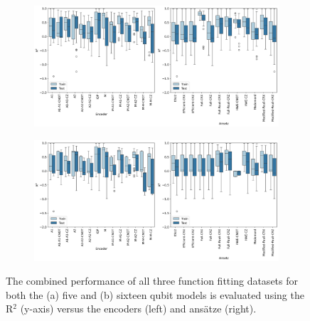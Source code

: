 \documentclass[journal=jacsat,manuscript=article]{achemso}
\begin{document}
\begin{figure}[H]
	\centering
	\begin{subfigure}[b]{0.49\textwidth}
		\centering
		\includegraphics[width=\textwidth]{../images/Function_Fitting/fivequbit/five_feature_function_fitting_boxplots.png}
		\caption{}
		\label{fig:five_feature_function_fitting_boxplots}
	\end{subfigure}
	\hfill		
	\begin{subfigure}[b]{0.49\textwidth}
		\centering
		\includegraphics[width=\textwidth]{../images/Function_Fitting/sixteenqubit/sixteen_feature_function_fitting_boxplots.png}
		\caption{}
		\label{fig:sixteen_feature_function_fitting_boxplots}
	\end{subfigure}
	\hfill		
	\caption{The combined performance of all three function fitting datasets for both the (a) five and (b) sixteen qubit models is evaluated using the R$^{2}$ (y-axis) versus the encoders (left) and ans\"{a}tze (right).}
	\label{fig:function_fitting_boxplots}
\end{figure}
\end{document}
